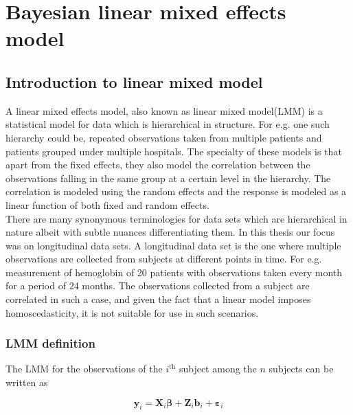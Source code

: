 
\chapter{Bayesian linear mixed effects model}
\label{ch : blmm}

\section{Introduction to linear mixed model}
\label{sec : lmm}
A linear mixed effects model, also known as linear mixed model(LMM) is a statistical model for data which is hierarchical in structure. For e.g. one such hierarchy could be, repeated observations taken from multiple patients and patients grouped under multiple hospitals. The specialty of these models is that apart from the fixed effects, they also model the correlation between the observations falling in the same group at a certain level in the hierarchy. The correlation is modeled using the random effects and the response is modeled as a linear function of both fixed and random effects.\\

There are many synonymous terminologies for data sets which are hierarchical in nature albeit with subtle nuances differentiating them. In this thesis our focus was on longitudinal data sets. A longitudinal data set is the one where multiple observations are collected from subjects at different points in time. For e.g. measurement of hemoglobin of 20 patients with observations taken every month for a period of 24 months. The observations collected from a subject are correlated in such a case, and given the fact that a linear model imposes homoscedasticity, it is not suitable for use in such scenarios.

\subsection{LMM definition}
\label{subsec : lmm_definition}
The LMM for the observations of the $i^\text{th}$ subject among the $n$ subjects can be written as

\begin{equation}
\label{eq : lmm_definition}
\boldsymbol{y}_i = \boldsymbol{X}_{i}\boldsymbol{\beta} + \boldsymbol{Z}_{i}\boldsymbol{b}_{i} + \boldsymbol{\varepsilon}_{i}
\end{equation}

